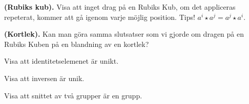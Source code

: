 \documentclass[11pt,fleqn]{book} %
\begin{document}
\begin{problem} \textbf{(Rubiks kub).}
  Visa att inget drag på en Rubiks Kub, om det appliceras repeterat, kommer att gå igenom varje möjlig position. Tips! \(a ^ i  \star a ^ j = a ^{j}  \star a ^ i\).
\end{problem}

\begin{problem} \textbf{(Kortlek).}
  Kan man göra samma slutsatser som vi gjorde om dragen på en Rubiks Kuben på en blandning av en kortlek?
\end{problem}

\begin{problem} %
  Visa att identitetselemenet är unikt.
\end{problem}

\begin{problem}
  Visa att inversen är unik.
\end{problem}

\begin{problem}
  Visa att snittet av två grupper är en grupp.
\end{problem}
\end{document}
